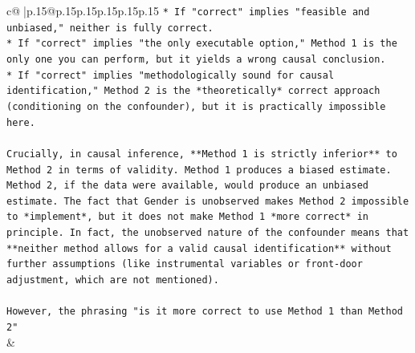 \documentclass{article}
\begin{document}
{\begin{supertabular}{c@{$\;$}|p{.15\linewidth}@{}p{.15\linewidth}p{.15\linewidth}p{.15\linewidth}p{.15\linewidth}p{.15\linewidth}}
{{{\texttt{*   If "correct" implies "feasible and unbiased," neither is fully correct.} \\
\texttt{*   If "correct" implies "the only executable option," Method 1 is the only one you can perform, but it yields a wrong causal conclusion.} \\
\texttt{*   If "correct" implies "methodologically sound for causal identification," Method 2 is the *theoretically* correct approach (conditioning on the confounder), but it is practically impossible here.} \\
\\ 
\texttt{Crucially, in causal inference, **Method 1 is strictly inferior** to Method 2 in terms of validity. Method 1 produces a biased estimate. Method 2, if the data were available, would produce an unbiased estimate. The fact that Gender is unobserved makes Method 2 impossible to *implement*, but it does not make Method 1 *more correct* in principle. In fact, the unobserved nature of the confounder means that **neither method allows for a valid causal identification** without further assumptions (like instrumental variables or front{-}door adjustment, which are not mentioned).} \\
\\ 
\texttt{However, the phrasing "is it more correct to use Method 1 than Method 2"} \\
            }
        }
    }
    & \\ \\


\end{supertabular}}
\end{document}
